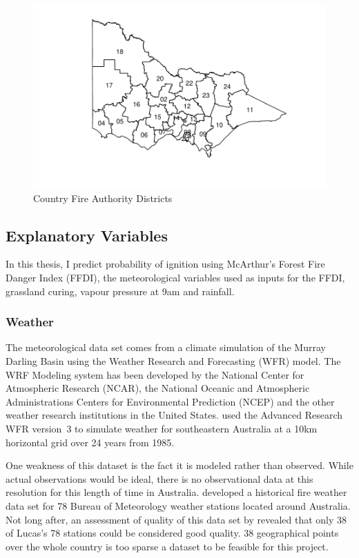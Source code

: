 \documentclass[11pt,a4paper]{article}
\begin{document}
\begin{figure}
  \centering
  \includegraphics[width=1\columnwidth]{figures/cfadis.pdf}
  \caption{Country Fire Authority Districts}
  \label{fig:dist}
\end{figure}


\subsection{Explanatory Variables}

In this thesis, I predict probability of ignition using McArthur's Forest Fire Danger Index (FFDI), the meteorological variables used as inputs for the FFDI, grassland curing, vapour pressure at 9am and rainfall.

\subsubsection{Weather}

The meteorological data set comes from a climate simulation of the Murray Darling Basin using the Weather Research and Forecasting (WFR) model. The WRF Modeling system has been developed by the National Center for Atmospheric Research (NCAR), the National Oceanic and Atmospheric Administrations Centers for Environmental Prediction (NCEP) and the other weather research institutions in the United States. \citet{evans10} used the Advanced Research WFR version~3 \citep{skamarock08} to simulate weather for southeastern Australia at a 10km horizontal grid over 24 years from 1985.

One weakness of this dataset is the fact it is modeled rather than observed. While actual observations would be ideal, there is no observational data at this resolution for this length of time in Australia. \citet{lucas10} developed a historical fire weather data set for 78 Bureau of Meteorology weather stations located around Australia. Not long after, an assessment of quality of this data set by \citet{clarke2013} revealed that only 38 of Lucas's 78 stations could be considered good quality. 38 geographical points over the whole country is too sparse a dataset to be feasible for this project.
\end{document}
